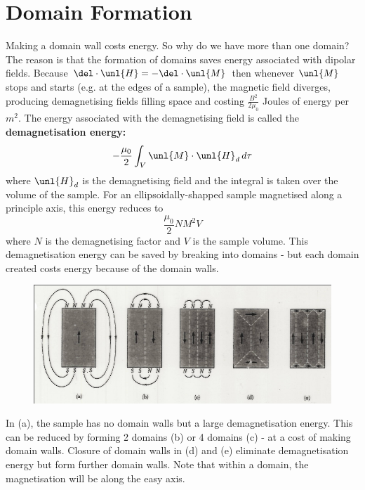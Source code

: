 \documentclass[a4paper, 11pt, normalem]{report}
\begin{document}
\section{Domain Formation}
Making a domain wall costs energy. 
So why do we have more than one domain?
The reason is that the formation of domains saves energy associated with dipolar fields. 
Because $\del\cdot\unl{H} = -\del\cdot\unl{M}$ then whenever $\unl{M}$ stops and starts (e.g. at the edges of a sample), the magnetic field diverges, producing demagnetising fields filling space and costing $\frac{B^2}{2\mu_0}$ Joules of energy per $m^2$.
The energy associated with the demagnetising field is called the \textbf{demagnetisation energy:}
\begin{equation}
    -\frac{\mu_0}{2}\int_V \unl{M}\cdot\unl{H}_d\,d\tau 
\end{equation}
where $\unl{H}_d$ is the demagnetising field and the integral is taken over the volume of the sample. 
For an ellipsoidally-shapped sample magnetised along a principle axis, this energy reduces to
\begin{equation}
    \frac{\mu_0}{2}NM^2V
\end{equation}
where $N$ is the demagnetising factor and $V$ is the sample volume. 
This demagnetisation energy can be saved by breaking into domains - but each domain created costs energy because of the domain walls. 
\begin{figure}[H]
    \centering
    \includegraphics[scale=0.5]{demag.png}
\end{figure}
In (a), the sample has no domain walls but a large demagnetisation energy. 
This can be reduced by forming 2 domains (b) or 4 domains (c) - at a cost of making domain walls. 
Closure of domain walls in (d) and (e) eliminate demagnetisation energy but form further domain walls. 
Note that within a domain, the magnetisation will be along the easy axis.
\end{document}
